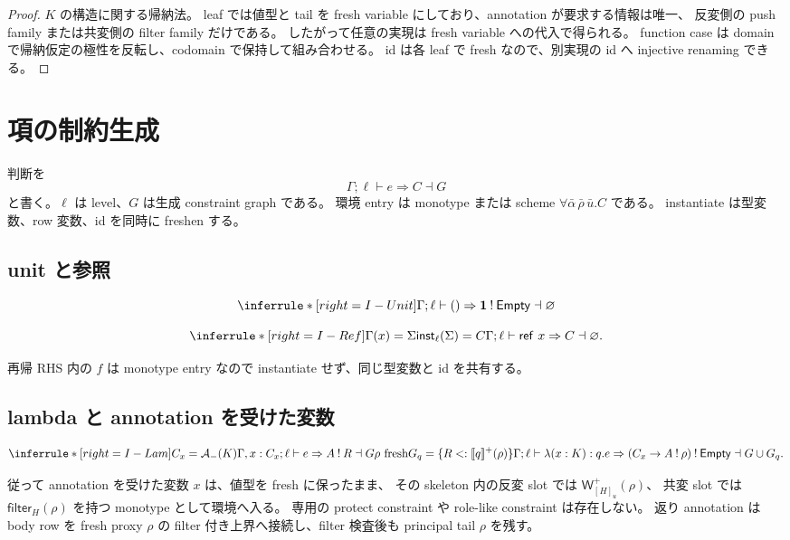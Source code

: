 \documentclass[uplatex,dvipdfmx,a4paper,10.5pt]{jsarticle}
\theoremstyle{jpplain}
\newcommand{\Empty}{\mathsf{Empty}}
\newcommand{\Unit}{\mathbf 1}
\newcommand{\inst}{\mathsf{inst}}
\newcommand{\Filter}[2]{\mathsf{filter}_{#1}(#2)}
\newcommand{\PWeight}[2]{\mathsf{W}^{+}_{#1}(#2)}
\newcommand{\takeop}[2]{[#1]_{#2}}
\newcommand{\comp}{\mathbin{!}}
\newcommand{\subty}[2]{#1\mathrel{<:}#2}
\newcommand{\kw}[1]{\mathsf{#1}}
\newcommand{\sem}[1]{[\![#1]\!]}
\begin{document}
\begin{proof}
$K$ の構造に関する帰納法。
leaf では値型と tail を fresh variable にしており、annotation が要求する情報は唯一、
反変側の push family または共変側の filter family だけである。
したがって任意の実現は fresh variable への代入で得られる。
function case は domain で帰納仮定の極性を反転し、codomain で保持して組み合わせる。
id は各 leaf で fresh なので、別実現の id へ injective renaming できる。
\end{proof}

\section{項の制約生成}

判断を
\[
  \Gamma;\ell\vdash e\Rightarrow C\dashv G
\]
と書く。$\ell$ は level、$G$ は生成 constraint graph である。
環境 entry は monotype または scheme
$\forall\bar\alpha\,\bar\rho\,\bar u.C$ である。
instantiate は型変数、row 変数、id を同時に freshen する。

\subsection{unit と参照}

\[
\inferrule*[right=I-Unit]
 { }
 {\Gamma;\ell\vdash ()\Rightarrow \Unit\comp\Empty\dashv\varnothing}
\]

\[
\inferrule*[right=I-Ref]
 {\Gamma(x)=\Sigma\\\inst_\ell(\Sigma)=C}
 {\Gamma;\ell\vdash \kw{ref}\ x\Rightarrow C\dashv\varnothing}.
\]

再帰 RHS 内の $f$ は monotype entry なので instantiate せず、同じ型変数と id を共有する。

\subsection{lambda と annotation を受けた変数}

\[
\inferrule*[right=I-Lam]
 {C_x=\mathcal A_-(K)\\
  \Gamma,x:C_x;\ell\vdash e\Rightarrow A\comp R\dashv G\\
  \rho\ \text{fresh}\\
  G_q=\{\subty{R}{\sem{q}^+(\rho)}\}}
 {\Gamma;\ell\vdash\lambda(x:K):q.e
   \Rightarrow (C_x\to A\comp\rho)\comp\Empty
   \dashv G\cup G_q}.
\]

従って annotation を受けた変数 $x$ は、値型を fresh に保ったまま、
その skeleton 内の反変 slot では $\PWeight{\takeop{H}{u}}{\rho}$、
共変 slot では $\Filter{H}{\rho}$ を持つ monotype として環境へ入る。
専用の protect constraint や role-like constraint は存在しない。
返り annotation は body row を fresh proxy $\rho$ の filter 付き上界へ接続し、filter 検査後も principal tail $\rho$ を残す。
\end{document}
